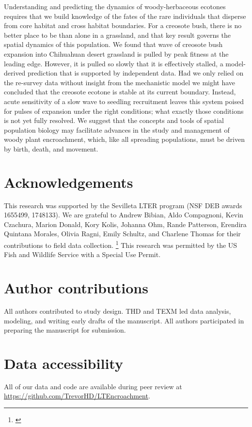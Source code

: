 \documentclass[11pt]{article}\usepackage[]{graphicx}\usepackage[usenames,dvipsnames]{xcolor}
\newcommand{\tom}[2]{{\color{red}{#1}}\footnote{\textit{\color{red}{#2}}}}
\begin{document}
Understanding and predicting the dynamics of woody-herbaceous ecotones requires that we build knowledge of the fates of the rare individuals that disperse from core habitat and cross habitat boundaries. 
For a creosote bush, there is no better place to be than alone in a grassland, and that key result governs the spatial dynamics of this population. 
We found that wave of creosote bush expansion into Chihuahuan desert grassland is pulled by peak fitness at the leading edge.
However, it is pulled so slowly that it is effectively stalled, a model-derived prediction that is supported by independent data. 
Had we only relied on the re-survey data without insight from the mechanistic model we might have concluded that the creosote ecotone is stable at its current boundary.
Instead, acute sensitivity of a slow wave to seedling recruitment leaves this system poised for pulses of expansion under the right conditions; what exactly those conditions is not yet fully resolved.
We suggest that the concepts and tools of spatial population biology may facilitate advances in the study and management of woody plant encroachment, which, like all spreading populations, must be driven by birth, death, and movement. 


\section*{Acknowledgements}
This research was supported by the Sevilleta LTER program (NSF DEB awards 1655499,	1748133).
We are grateful to Andrew Bibian, Aldo Compagnoni, Kevin Czachura, Marion Donald, Kory Kolis, Johanna Ohm, Rande Patterson, Erendira Quintana Morales, Olivia Ragni, Emily Schultz, and Charlene Thomas for their contributions to field data collection.
\tom{Kat Shea and Olav Skarpaas provided helpful guidance on dispersal modeling.}{Correct, Trevor?}
This research was permitted by the US Fish and Wildlife Service with a Special Use Permit.

\section*{Author contributions}
All authors contributed to study design. 
THD and TEXM led data analysis, modeling, and writing early drafts of the manuscript. 
All authors participated in preparing the manuscript for submission.

\section*{Data accessibility}
All of our data and code are available during peer review at \url{https://github.com/TrevorHD/LTEncroachment}. 
\end{document}
